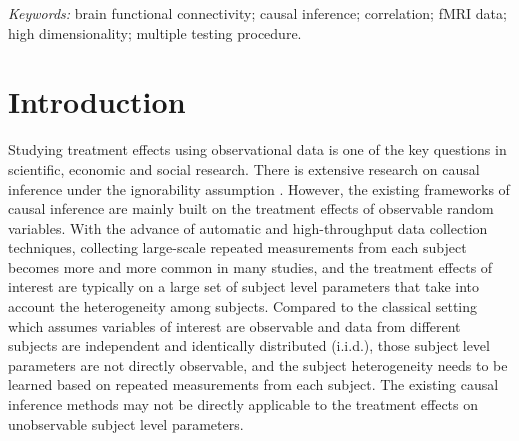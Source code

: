 \documentclass[12pt]{article}
\theoremstyle{definition}
\begin{document}
\noindent%
{\it Keywords:}  brain functional connectivity; causal inference; correlation; fMRI data; high dimensionality; multiple testing procedure.
\vfill

\newpage
{}

\section{Introduction}

Studying treatment effects using observational data is one of the key questions in scientific, economic and social research. 
There is extensive research on causal inference under the ignorability assumption \citep{rosenbaum1983}. 
However, the existing frameworks of causal inference are mainly built on the treatment effects of observable random variables. 
With the advance of automatic and high-throughput data collection techniques, collecting large-scale repeated measurements from each subject becomes more and more common in many studies,
and the treatment effects of interest are typically on a large set of subject level parameters that take into account the heterogeneity among subjects.
Compared to the classical setting which assumes variables of interest are observable and data from different subjects are independent and identically distributed (i.i.d.),
those subject level parameters are not directly observable, and the subject heterogeneity needs to be learned based on repeated measurements from each subject. 
The existing causal inference methods may not be directly applicable to the treatment effects on unobservable subject level parameters.
\end{document}

